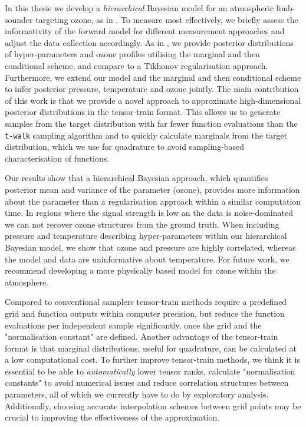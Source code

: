 In this thesis we develop a \textit{hierarchical} Bayesian model for an atmospheric limb-sounder targeting ozone, as in \cite{mipas2000handbook}.
To measure most effectively, we briefly assess the informativity of the forward model for different measurement approaches and adjust the data collection accordingly.
As in \cite{fox2016fast}, we provide posterior distributions of hyper-parameters and ozone profiles utilising the marginal and then conditional scheme, and compare to a Tikhonov regularisation approach.
Furthermore, we extend our model and the marginal and then conditional scheme to infer posterior pressure, temperature and ozone jointly.
The main contribution of this work is that we provide a novel approach \cite{cui2022deep} to approximate high-dimensional posterior distributions in the tensor-train format.
This allows us to generate samples from the target distribution with far fewer function evaluations than the \texttt{t-walk} sampling algorithm \cite{christen2010general} and to quickly calculate marginals from the target distribution, which we use for quadrature to avoid sampling-based characterisation of functions.

Our results show that a hierarchical Bayesian approach, which quantifies posterior mean and variance of the parameter (ozone), provides more information about the parameter than a regularisation approach within a similar computation time.
In regions where the signal strength is low an the data is noise-dominated we can not recover ozone structures from the ground truth.
When including pressure and temperature describing hyper-parameters within our hierarchical Bayesian model, we show that ozone and pressure are highly correlated, whereas the model and data are uninformative about temperature.
For future work, we recommend developing a more physically based model for ozone within the atmosphere.

Compared to conventional samplers tensor-train methods require a predefined grid and function outputs within computer precision, but reduce the function evaluations per independent sample significantly, once the grid and the "normalisation constant" are defined.
Another advantage of the tensor-train format is that marginal distributions, useful for quadrature, can be calculated at a low computational cost.
To further improve tensor-train methods, we think it is essential to be able to \textit{automatically} lower tensor ranks, calculate "normalisation constants" to avoid numerical issues and reduce correlation structures between parameters, all of which we currently have to do by exploratory analysis.
Additionally, choosing accurate interpolation schemes between grid points may be crucial to improving the effectiveness of the approximation.